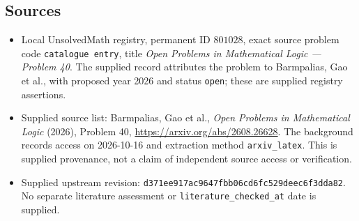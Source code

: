 \documentclass[11pt]{article}
\begin{document}
\subsection{Sources}
\begin{itemize}
\item Local UnsolvedMath registry, permanent ID \(801028\), exact source problem code \texttt{catalogue entry}, title \emph{Open Problems in Mathematical Logic --- Problem 40}. The supplied record attributes the problem to Barmpalias, Gao et al., with proposed year 2026 and status \texttt{open}; these are supplied registry assertions.
\item Supplied source list: Barmpalias, Gao et al., \emph{Open Problems in Mathematical Logic} (2026), Problem 40, \url{https://arxiv.org/abs/2608.26628}. The background records access on 2026-10-16 and extraction method \texttt{arxiv\_latex}. This is supplied provenance, not a claim of independent source access or verification.
\item Supplied upstream revision: \texttt{d371ee917ac9647fbb06cd6fc529deec6f3dda82}. No separate literature assessment or \texttt{literature\_checked\_at} date is supplied.
\end{itemize}
\end{document}
